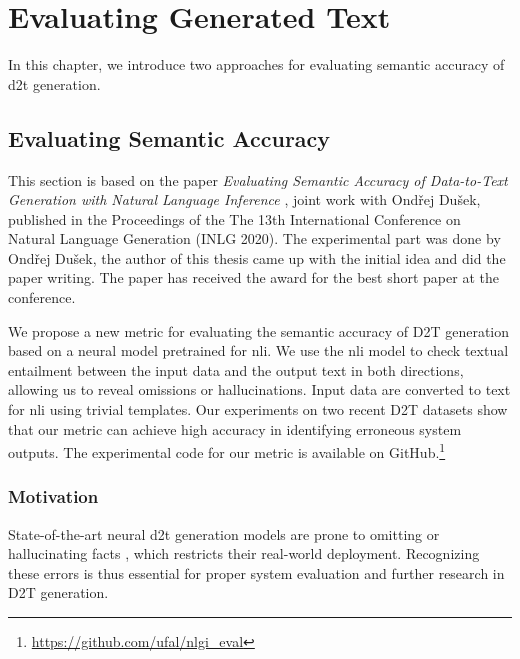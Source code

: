 
\chapter{Evaluating Generated Text}
\label{chap:evaluation}


In this chapter, we introduce two approaches for evaluating semantic accuracy of \ac{d2t} generation.

\section{Evaluating Semantic Accuracy}
\label{sec:sem-acc}

\begin{refbox}
    This section is based on the paper \emph{Evaluating Semantic Accuracy of Data-to-Text Generation with Natural Language Inference} \cite{dusekEvaluatingSemanticAccuracy2020}, joint work with Ondřej Dušek, published in the Proceedings of the The 13th International Conference on Natural Language Generation (INLG 2020). The experimental part was done by Ondřej Dušek, the author of this thesis came up with the initial idea and did the paper writing. The paper has received the award for the best short paper at the conference.
\end{refbox}

We propose a new metric for evaluating the semantic accuracy of D2T generation
based on a neural model pretrained for \ac{nli}. We use the \ac{nli} model to check textual entailment between the input data and the output text in both directions, allowing us to reveal omissions or hallucinations. Input data are converted to text for \ac{nli} using trivial templates. Our experiments on two recent D2T datasets show that our metric can achieve high accuracy in identifying erroneous system outputs. The experimental code for our metric is available on GitHub.\footnote{\url{https://github.com/ufal/nlgi_eval}}

\subsection{Motivation}
State-of-the-art neural \ac{d2t} generation models are prone to omitting or hallucinating facts \cite{gehrmanngehrmannEndtoEndContentPlan2018,ferrferreiraNeuralDatatotextGeneration2019,dusekEvaluatingStateoftheartEndtoEnd2020}, which restricts their real-world deployment. Recognizing these errors is thus essential for
proper system evaluation and further research in D2T generation.


